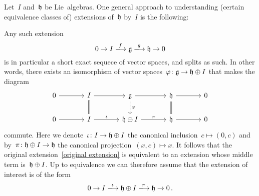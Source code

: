 \begin{remark}
  \label{general approach to extensions}
  Let~$I$ and~$\mathfrak{h}$ be Lie~algebras.
  One general approach to understanding (certain equivalence classes of) extensions of~$\mathfrak{h}$ by~$I$ is the following:
  
  Any such extension
  \begin{equation}
  \label{original extension}
    0
    \to
    I
    \xlongto{f}
    \glie
    \xlongto{g}
    \hlie
    \to
    0
  \end{equation}
  is in particular a short exact sequece of vector spaces, and splits as such.
  In other words, there exists an isomorphism of vector spaces~$\varphi \colon \mathfrak{g} \to \mathfrak{h} \oplus I$ that makes the diagram
  \[
    \begin{tikzcd}[column sep = large]
      0
      \arrow{r}
      &
      I
      \arrow{r}
      \arrow[equal]{d}
      &
      \glie
      \arrow{r}
      \arrow[dashed]{d}[right]{\varphi}
      &
      \hlie
      \arrow{r}
      \arrow[equal]{d}
      &
      0
      \\
      0
      \arrow{r}
      &
      I
      \arrow{r}[above]{\iota}
      &
      \hlie \oplus I
      \arrow{r}[above]{\pi}
      &
      \hlie
      \arrow{r}
      &
      0
    \end{tikzcd}
  \]
  commute.
  Here we denote~$\iota \colon I \to \mathfrak{h} \oplus I$ the canonical inclusion~$c \mapsto (0,c)$ and by~$\pi \colon \mathfrak{h} \oplus I \to \mathfrak{h}$ the canonical projection~$(x,c) \mapsto x$.
  It follows that the original extension~\eqref{original extension} is equivalent to an extension whose middle term is~$\mathfrak{h} \oplus I$.
  Up to equivalence we can therefore assume that the extension of interest is of the form
  \[
    0
    \to
    I
    \xlongto{\iota}
    \hlie \oplus I
    \xlongto{\pi}
    \hlie
    \to
    0 \,.
  \]


\end{remark}
